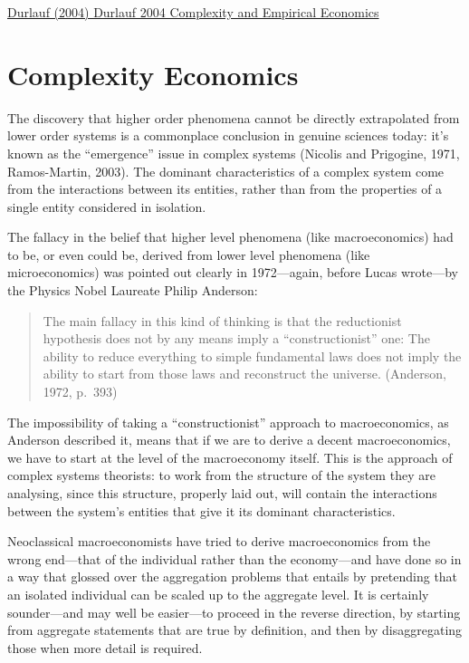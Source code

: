 \documentclass[
]{book}
\begin{document}
\href{pdf/Durlauf_2004_Complexity_and_Empirical_Economics.pdf}{Durlauf (2004) Durlauf 2004 Complexity and Empirical Economics}

\hypertarget{complexity-economics}{%
\chapter{Complexity Economics}\label{complexity-economics}}

The discovery that higher order phenomena cannot be directly extrapolated from lower order systems is a commonplace conclusion in genuine sciences today: it's known as the ``emergence'' issue in complex systems (Nicolis and Prigogine, 1971, Ramos-Martin, 2003). The dominant characteristics of a complex system come from the interactions between its entities, rather than from the properties of a single entity considered in isolation.

The fallacy in the belief that higher level phenomena (like macroeconomics) had to be, or even could be, derived from lower level phenomena (like microeconomics) was pointed out clearly in 1972---again, before Lucas wrote---by the Physics Nobel Laureate Philip Anderson:

\begin{quote}
The main fallacy in this kind of thinking is that the reductionist hypothesis does not by any means imply a ``constructionist'' one: The ability to reduce everything to simple fundamental laws does not imply the ability to start from those laws and reconstruct the universe. (Anderson, 1972, p.~393)
\end{quote}

The impossibility of taking a ``constructionist'' approach to macroeconomics, as Anderson described it, means that if we are to derive a decent macroeconomics, we have to start at the level of the macroeconomy itself. This is the approach of complex systems theorists: to work from the structure of the system they are analysing, since this structure, properly laid out, will contain the interactions between the system's entities that give it its dominant characteristics.

Neoclassical macroeconomists have tried to derive macroeconomics from the wrong end---that of the individual rather than the economy---and have done so in a way that glossed over the aggregation problems that entails by pretending that an isolated individual can be scaled up to the aggregate level. It is certainly sounder---and may well be easier---to proceed in the reverse direction, by starting from aggregate statements that are true by definition, and then by disaggregating those when more detail is required.
\end{document}
